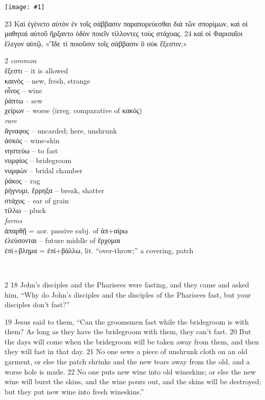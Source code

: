 \documentclass[10pt,a5paper,twoside,twocolumn]{book}
\newcommand{\fig}[1]{\texttt{[image: \#1]}\label{fig:#1}}
\newcommand*\cleartoleftpage{%
  \ifodd\value{page}\hbox{}\clearpage\fi
}
\newcommand{\separator}{
  \vspace{-0.5\baselineskip}%
  \hspace{0.27\textwidth}%
  \noindent\makebox[\linewidth]{\resizebox{0.3333\linewidth}{1pt}{$\bullet$}}\bigskip%
  \vspace{-0.5\baselineskip}
}
\newenvironment{facing}{\cleartoleftpage}{\clearpage\pagebreak}
\newenvironment{help}{\clearpage}{}
\newenvironment{helpsec}{\begin{minipage}[t]{\textwidth}\begin{multicols}{2}}{\end{multicols}\end{minipage}}
\newenvironment{vocab}{\begin{helpsec}}{\end{helpsec}}
\newenvironment{translation}{\separator\\\begin{helpsec}\footnotesize}{\end{helpsec}}
\begin{document}
\vfill

\fig{02-23} %

	23 Καὶ ἐγένετο αὐτὸν ἐν τοῖς σάββασιν παραπορεύεσθαι διὰ τῶν σπορίμων, καὶ οἱ μαθηταὶ αὐτοῦ ἤρξαντο ὁδὸν ποιεῖν τίλλοντες τοὺς στάχυας.
 24 καὶ οἱ Φαρισαῖοι ἔλεγον αὐτῷ, «Ἴδε τί ποιοῦσιν τοῖς σάββασιν ὃ οὐκ ἔξεστιν;»



\begin{facing}
\begin{help}
\begin{vocab}
\emph{common}\\
ἔξεστι -- it is allowed\\
καινός -- new, fresh, strange\\
οἶνος -- wine\\
ῥάπτω -- sew\\
χείρων -- worse (irreg. comparative of κακός)\\

\emph{rare}\\
ἄγναφος -- uncarded; here, unshrunk\\
ἀσκός -- wine-skin\\
νηστεύω -- to fast\\
νυμφίος -- bridegroom\\
νυμφών -- bridal chamber\\
ῥάκος -- rag\\
ῥήγνυμι, ἔρρηξα -- break, shatter \\
στάχυς -- ear of grain\\
τίλλω -- pluck\\

\emph{forms}\\
ἀπαρθῇ = aor. passive subj. of ἀπ+αίρω\\
ἐλεύσονται -- future middle of ἔρχομαι\\
ἐπί+βλημα = ἐπί+βάλλω, lit. ``over-throw;'' a covering, patch\\

\end{vocab}
\begin{translation}
 18 John's disciples and the Pharisees were fasting, and they came and asked him, ``Why do John's disciples and the disciples of the Pharisees fast, but your disciples don't fast?''

19 Jesus said to them, ``Can the groomsmen fast while the bridegroom is with them? As long as they have the bridegroom with them, they can't fast. 20  But the days will come when the bridegroom will be taken away from them, and then they will fast in that day. 21  No one sews a piece of unshrunk cloth on an old garment, or else the patch shrinks and the new tears away from the old, and a worse hole is made. 22  No one puts new wine into old wineskins; or else the new wine will burst the skins, and the wine pours out, and the skins will be destroyed; but they put new wine into fresh wineskins.''


\end{translation}
\end{help}
\end{facing}
\end{document}
